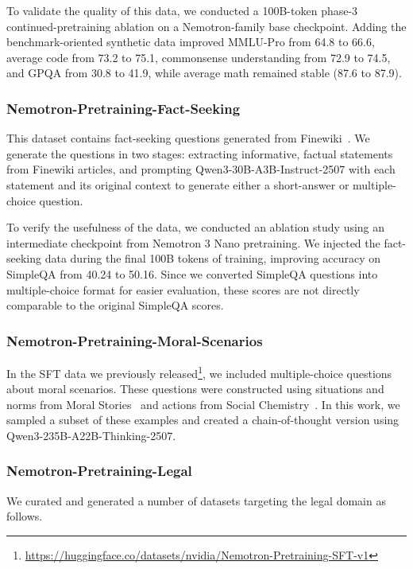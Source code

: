 To validate the quality of this data, we conducted a 100B-token phase-3 continued-pretraining ablation on a Nemotron-family base checkpoint. Adding the benchmark-oriented synthetic data improved MMLU-Pro from 64.8 to 66.6, average code from 73.2 to 75.1, commonsense understanding from 72.9 to 74.5, and GPQA from 30.8 to 41.9, while average math remained stable (87.6 to 87.9).

\subsubsection{Nemotron-Pretraining-Fact-Seeking}

This dataset contains fact-seeking questions generated from Finewiki~\citep{penedo2025finewiki}. We generate the questions in two stages:
extracting informative, factual statements from Finewiki articles, and prompting Qwen3-30B-A3B-Instruct-2507 with each statement and its original context to generate either a short-answer or multiple-choice question.

To verify the usefulness of the data, we conducted an ablation study using an intermediate checkpoint from Nemotron 3 Nano pretraining. We injected the fact-seeking data during the final 100B tokens of training, improving accuracy on SimpleQA from 40.24 to 50.16. Since we converted SimpleQA questions into multiple-choice format for easier evaluation, these scores are not directly comparable to the original SimpleQA scores.

\subsubsection{Nemotron-Pretraining-Moral-Scenarios}

In the SFT data we previously released\footnote{\url{https://huggingface.co/datasets/nvidia/Nemotron-Pretraining-SFT-v1}}, we included multiple-choice questions about moral scenarios. These questions were constructed using situations and norms from Moral Stories~\citep{emelin-etal-2021-moral} and actions from Social Chemistry~\citep{forbes-etal-2020-social}. In this work, we sampled a subset of these examples and created a chain-of-thought version using Qwen3-235B-A22B-Thinking-2507.

\subsubsection{Nemotron-Pretraining-Legal}

We curated and generated a number of datasets targeting the legal domain as follows.

